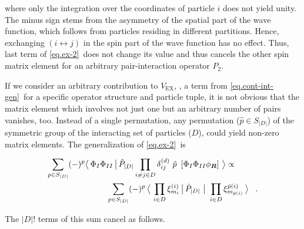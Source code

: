 \documentclass[aps,prd,twocolumn,tightenlines,letterpaper,nofootinbib]{revtex4-1}
\begin{document}
where only the integration over the coordinates of particle $i$ does not
yield unity. The minus sign stems from the asymmetry of the spatial part
of the wave function, which follows from particles residing in different
partitions.
Hence, exchanging $(i\leftrightarrow j)$ in the spin part of the
wave function has no effect. Thus, last term of \eqref{eq.ex-2}~does
not change its value and thus cancels the other spin matrix element
for an arbitrary pair-interaction operator $\hat{P}_2$.

If we consider an arbitrary contribution to $V_\text{EX}$, \ie,
a term from \eqref{eq.cont-int-gen}~for a specific operator structure and
particle tuple,
it is not obvious that the matrix element
which involves not just one but an arbitrary number of pairs
vanishes, too. Instead of a single permutation, any permutation
($\hat{p}\in S_{|D|}$) of the symmetric group of the interacting set of particles
($D$), could yield non-zero matrix elements. The generalization of \eqref{eq.ex-2}~is

\begin{align}\la{eq.ex-2}
\sum_{p\in S_{|D|}}(-)^p\ov{\Phi_I\Phi_{II}}{\hat{P}_{|D|}
\prod_{i\neq j\in D}\delta^{(d)}_{ij}~\hat{p}~
\left[\Phi_I\Phi_{II}\phi_{\ve{R}}\right]}
\propto\hspace{1cm}
\nonumber\\
\sum_{p\in S_{|D|}}(-)^p\,\ov{\prod_{i\in D}\xi^{(i)}_{m_i}}{\hat{P}_{|D|}
~\big\vert~\prod_{i\in D}\xi^{\hat{p}(i)}_{m_{\hat{p}(i)}}}\;\;\;.
\nonumber\\
\end{align}

The $|D|!$ terms of this sum cancel as follows. 
\end{document}
